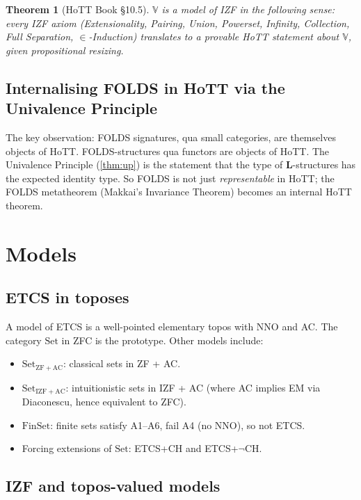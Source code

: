 \documentclass[12pt]{article}
\newtheorem{theorem}{Theorem}[section]
\theoremstyle{definition}
\theoremstyle{remark}
\begin{document}
\begin{theorem}[HoTT Book \S10.5]
\label{thm:vmodelizf}
$\mathbb{V}$ is a model of IZF in the following sense: every IZF axiom (Extensionality,
Pairing, Union, Powerset, Infinity, Collection, Full Separation, $\in$-Induction)
translates to a provable HoTT statement about $\mathbb{V}$, given propositional resizing.
\end{theorem}

\subsection{Internalising FOLDS in HoTT via the Univalence Principle}

The key observation: FOLDS signatures, qua small categories, are themselves objects of
HoTT. FOLDS-structures qua functors are objects of HoTT. The Univalence Principle
(\cref{thm:up}) is the statement that the type of $\mathbf{L}$-structures has the
expected identity type. So FOLDS is not just \emph{representable} in HoTT; the FOLDS
metatheorem (Makkai's Invariance Theorem) becomes an internal HoTT theorem.

\section{Models}
\label{sec:models}

\subsection{ETCS in toposes}

A model of ETCS is a well-pointed elementary topos with NNO and AC. The category
$\mathrm{Set}$ in ZFC is the prototype. Other models include:
\begin{itemize}
\item $\mathrm{Set}_{\mathrm{ZF+AC}}$: classical sets in ZF + AC.
\item $\mathrm{Set}_{\mathrm{IZF+AC}}$: intuitionistic sets in IZF + AC (where AC implies
EM via Diaconescu, hence equivalent to ZFC).
\item $\mathrm{FinSet}$: finite sets satisfy A1--A6, fail A4 (no NNO), so not ETCS.
\item Forcing extensions of $\mathrm{Set}$: ETCS+CH and ETCS+$\neg$CH.
\end{itemize}

\subsection{IZF and topos-valued models}
\end{document}
